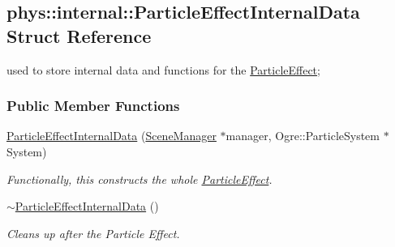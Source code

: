 \hypertarget{structphys_1_1internal_1_1ParticleEffectInternalData}{
\subsection{phys::internal::ParticleEffectInternalData Struct Reference}
\label{structphys_1_1internal_1_1ParticleEffectInternalData}
}


used to store internal data and functions for the \hyperlink{classphys_1_1ParticleEffect}{ParticleEffect};  


\subsubsection*{Public Member Functions}
\begin{DoxyCompactItemize}
\item 
\hypertarget{structphys_1_1internal_1_1ParticleEffectInternalData_aa2020347e2755e1476c11f3bc190af57}{
\hyperlink{structphys_1_1internal_1_1ParticleEffectInternalData_aa2020347e2755e1476c11f3bc190af57}{ParticleEffectInternalData} (\hyperlink{classphys_1_1SceneManager}{SceneManager} $\ast$manager, Ogre::ParticleSystem $\ast$System)}
\label{structphys_1_1internal_1_1ParticleEffectInternalData_aa2020347e2755e1476c11f3bc190af57}

\begin{DoxyCompactList}\small\item\em Functionally, this constructs the whole \hyperlink{classphys_1_1ParticleEffect}{ParticleEffect}. \item\end{DoxyCompactList}\item 
\hypertarget{structphys_1_1internal_1_1ParticleEffectInternalData_a42dbfeea2d498ef1b023cebe4e5d4257}{
\hyperlink{structphys_1_1internal_1_1ParticleEffectInternalData_a42dbfeea2d498ef1b023cebe4e5d4257}{$\sim$ParticleEffectInternalData} ()}
\label{structphys_1_1internal_1_1ParticleEffectInternalData_a42dbfeea2d498ef1b023cebe4e5d4257}

\begin{DoxyCompactList}\small\item\em Cleans up after the Particle Effect. \item\end{DoxyCompactList}\end{DoxyCompactItemize}
